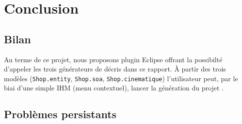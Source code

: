 \chapter{Conclusion}\label{chap:COnc}

\section{Bilan}

Au terme de ce projet, nous proposons plugin Eclipse offrant la possibilté d'appeler les trois générateurs de décris dans ce rapport. À partir des trois modèles (\verb+Shop.entity+, \verb+Shop.soa+, \verb+Shop.cinematique+) l'utilisateur peut, par le biai d'une simple IHM (menu contextuel), lancer la génération du projet \kwplay{}. 


\section{Problèmes persistants}



